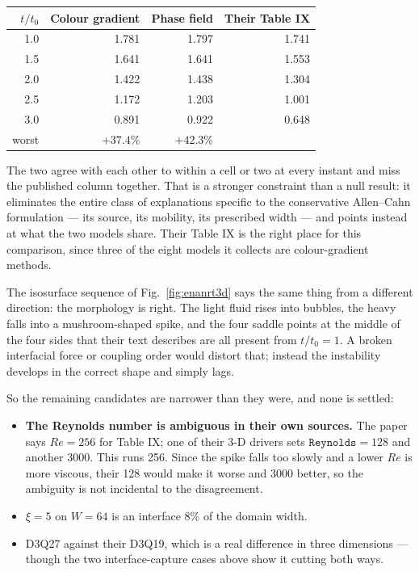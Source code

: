 \documentclass[11pt,a4paper]{article}
\begin{document}
\begin{center}
\begin{tabular}{rrrr}
  \toprule
  $t/t_0$ & Colour gradient & Phase field & Their Table IX \\
  \midrule
  1.0 & 1.781 & 1.797 & 1.741 \\
  1.5 & 1.641 & 1.641 & 1.553 \\
  2.0 & 1.422 & 1.438 & 1.304 \\
  2.5 & 1.172 & 1.203 & 1.001 \\
  3.0 & 0.891 & 0.922 & 0.648 \\
  \midrule
  worst & $+37.4$\% & $+42.3$\% & \\
  \bottomrule
\end{tabular}
\end{center}

The two agree with each other to within a cell or two at every instant and
miss the published column together. That is a stronger constraint than a null
result: it eliminates the entire class of explanations specific to the
conservative Allen--Cahn formulation --- its source, its mobility, its
prescribed width --- and points instead at what the two models share. Their
Table IX is the right place for this comparison, since three of the eight
models it collects are colour-gradient methods.

The isosurface sequence of Fig.~\ref{fig:enanrt3d} says the same thing from a
different direction: the morphology is right. The light fluid rises into
bubbles, the heavy falls into a mushroom-shaped spike, and the four saddle
points at the middle of the four sides that their text describes are all
present from $t/t_0=1$. A broken interfacial force or coupling order would
distort that; instead the instability develops in the correct shape and simply
lags.

So the remaining candidates are narrower than they were, and none is settled:

\begin{itemize}
  \item \textbf{The Reynolds number is ambiguous in their own sources.} The
    paper says $Re=256$ for Table IX; one of their 3-D drivers sets
    $\mathtt{Reynolds}=128$ and another 3000. This runs 256. Since the spike
    falls too slowly and a lower $Re$ is more viscous, their 128 would make it
    worse and 3000 better, so the ambiguity is not incidental to the
    disagreement.
  \item $\xi=5$ on $W=64$ is an interface 8\% of the domain width.
  \item D3Q27 against their D3Q19, which is a real difference in three
    dimensions --- though the two interface-capture cases above show it cutting
    both ways.
\end{itemize}
\end{document}
